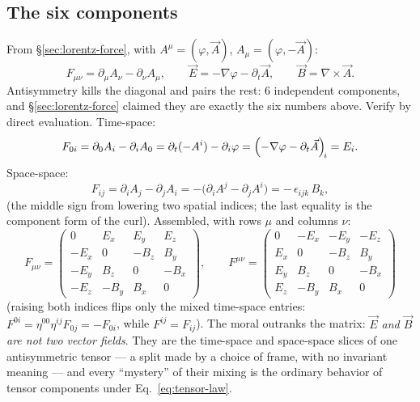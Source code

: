 \documentclass[11pt]{article}
\theoremstyle{plain}
\theoremstyle{definition}
\theoremstyle{remark}
\newcommand{\vE}{\vec{E}}
\newcommand{\vB}{\vec{B}}
\begin{document}
\subsection{The six components}
\label{sec:six-components}

From \S\ref{sec:lorentz-force}, with $A^\mu = (\varphi, \vec A)$,
$A_\mu = (\varphi, -\vec A)$:
\begin{equation}
  F_{\mu\nu} = \partial_\mu A_\nu - \partial_\nu A_\mu,
  \qquad
  \vE = -\nabla\varphi - \partial_t\vec A,
  \qquad
  \vB = \nabla\times\vec A .
\end{equation}
Antisymmetry kills the diagonal and pairs the rest: $6$ independent
components, and \S\ref{sec:lorentz-force} claimed they are exactly the
six numbers above. Verify by direct evaluation. Time-space:
\begin{equation}
  F_{0i}
  = \partial_0 A_i - \partial_i A_0
  = \partial_t(-A^i) - \partial_i\varphi
  = \Bigl(-\nabla\varphi - \partial_t\vec A\Bigr)_{\!i}
  = E_i .
\end{equation}
Space-space:
\begin{equation}
  F_{ij}
  = \partial_i A_j - \partial_j A_i
  = -\bigl(\partial_i A^j - \partial_j A^i\bigr)
  = -\,\epsilon_{ijk}\,B_k ,
\end{equation}
(the middle sign from lowering two spatial indices; the last equality
is the component form of the curl). Assembled, with rows $\mu$ and
columns $\nu$:
\begin{equation}
  F_{\mu\nu} =
  \begin{pmatrix}
    0 & E_x & E_y & E_z \\
    -E_x & 0 & -B_z & B_y \\
    -E_y & B_z & 0 & -B_x \\
    -E_z & -B_y & B_x & 0
  \end{pmatrix},
  \qquad
  F^{\mu\nu} =
  \begin{pmatrix}
    0 & -E_x & -E_y & -E_z \\
    E_x & 0 & -B_z & B_y \\
    E_y & B_z & 0 & -B_x \\
    E_z & -B_y & B_x & 0
  \end{pmatrix}
  \label{eq:F-matrix}
\end{equation}
(raising both indices flips only the mixed time-space entries:
$F^{0i} = \eta^{00}\eta^{ij}F_{0j} = -F_{0i}$, while
$F^{ij} = F_{ij}$). The moral outranks the matrix: \emph{$\vE$ and
$\vB$ are not two vector fields}. They are the time-space and
space-space slices of one antisymmetric tensor --- a split made by a
choice of frame, with no invariant meaning --- and every ``mystery''
of their mixing is the ordinary behavior of tensor components under
Eq.~\eqref{eq:tensor-law}.
\end{document}
